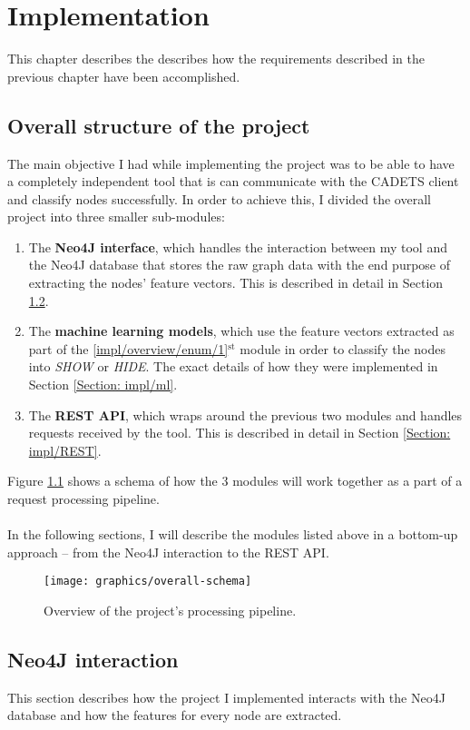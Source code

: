 
	\chapter{Implementation}
	This chapter describes the describes how the requirements described in the previous chapter have been accomplished. 
	\section{Overall structure of the project} \label{Section: impl/overview}
	The main objective I had while implementing the project was to be able to have a completely independent tool that is can communicate with the CADETS client and classify nodes successfully. In order to achieve this, I divided the overall project into three smaller sub-modules:
	
	\begin{enumerate}
		\item \label{impl/overview/enum/1} The \textbf{Neo4J interface}, which handles the interaction between my tool and the Neo4J database that stores the raw graph data with the end purpose of extracting the nodes' feature vectors. This is described in detail in Section \ref{Section: impl/neo4j}.
		\item The \textbf{machine learning models}, which use the feature vectors extracted as part of the \ref{impl/overview/enum/1}$^{\text{st}}$ module in order to classify the nodes into \textit{SHOW} or \textit{HIDE}. The exact details of how they were implemented in Section \ref{Section: impl/ml}.
		\item The \textbf{REST API}, which wraps around the previous two modules and handles requests received by the tool. This is described in detail in Section \ref{Section: impl/REST}.
	\end{enumerate}
	Figure \ref{Fig: impl/pipeline} shows a schema of how the 3 modules will work together as a part of a request processing pipeline. 
	\\ \\
	In the following sections, I will describe the modules listed above in a bottom-up approach -- from the Neo4J interaction to the REST API. 
	\begin{figure}[H]
		\centering
		\texttt{[image: graphics/overall-schema]}	
		\caption[Processing pipeline]{Overview of the project's processing pipeline.}
		\label{Fig: impl/pipeline}
	\end{figure}
	\section{Neo4J interaction} \label{Section: impl/neo4j}
	This section describes how the project I implemented interacts with the Neo4J database and how the features for every node are extracted. 
